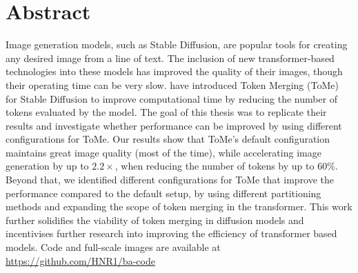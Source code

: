 \section*{Abstract}
Image generation models, such as Stable Diffusion, are popular tools for creating any desired image from a line of text. 
The inclusion of new transformer-based technologies into these models has improved the quality of their images, though their operating time can be very slow.
\cite{bolya2023tomesd} have introduced Token Merging (ToMe) for Stable Diffusion to improve computational time by reducing the number of tokens evaluated by the model.
The goal of this thesis was to replicate their results and investigate whether performance can be improved by using different configurations for ToMe.
Our results show that ToMe's default configuration maintains great image quality (most of the time), while accelerating image generation by up to $2.2 \times$, when reducing the number of tokens by up to \(60\%\). Beyond that, we identified different configurations for ToMe that improve the performance compared to the default setup, by using different partitioning methods and expanding the scope of token merging in the transformer. 
This work further solidifies the viability of token merging in diffusion models and incentivises further research into improving the efficiency of transformer based models.
Code and full-scale images are available at \url{https://github.com/HNR1/ba-code}
